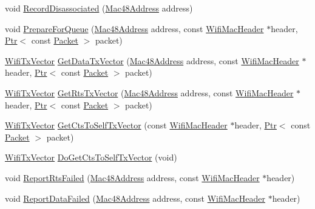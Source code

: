 \begin{DoxyCompactItemize}
void \hyperlink{classns3_1_1WifiRemoteStationManager_abcb92c63342aed2603c1dfb131e0fe8a}{Record\+Disassociated} (\hyperlink{classns3_1_1Mac48Address}{Mac48\+Address} address)
\item 
void \hyperlink{classns3_1_1WifiRemoteStationManager_a4812b9abae368de05cbd1393b7053f90}{Prepare\+For\+Queue} (\hyperlink{classns3_1_1Mac48Address}{Mac48\+Address} address, const \hyperlink{classns3_1_1WifiMacHeader}{Wifi\+Mac\+Header} $\ast$header, \hyperlink{classns3_1_1Ptr}{Ptr}$<$ const \hyperlink{classns3_1_1Packet}{Packet} $>$ packet)
\item 
\hyperlink{classns3_1_1WifiTxVector}{Wifi\+Tx\+Vector} \hyperlink{classns3_1_1WifiRemoteStationManager_ad81efbe48611977c8cea482721fd823b}{Get\+Data\+Tx\+Vector} (\hyperlink{classns3_1_1Mac48Address}{Mac48\+Address} address, const \hyperlink{classns3_1_1WifiMacHeader}{Wifi\+Mac\+Header} $\ast$header, \hyperlink{classns3_1_1Ptr}{Ptr}$<$ const \hyperlink{classns3_1_1Packet}{Packet} $>$ packet)
\item 
\hyperlink{classns3_1_1WifiTxVector}{Wifi\+Tx\+Vector} \hyperlink{classns3_1_1WifiRemoteStationManager_a0f4f6984f11037508c46a1af90508a34}{Get\+Rts\+Tx\+Vector} (\hyperlink{classns3_1_1Mac48Address}{Mac48\+Address} address, const \hyperlink{classns3_1_1WifiMacHeader}{Wifi\+Mac\+Header} $\ast$header, \hyperlink{classns3_1_1Ptr}{Ptr}$<$ const \hyperlink{classns3_1_1Packet}{Packet} $>$ packet)
\item 
\hyperlink{classns3_1_1WifiTxVector}{Wifi\+Tx\+Vector} \hyperlink{classns3_1_1WifiRemoteStationManager_a927bcc3d3c01646eed7a5e9d741c243b}{Get\+Cts\+To\+Self\+Tx\+Vector} (const \hyperlink{classns3_1_1WifiMacHeader}{Wifi\+Mac\+Header} $\ast$header, \hyperlink{classns3_1_1Ptr}{Ptr}$<$ const \hyperlink{classns3_1_1Packet}{Packet} $>$ packet)
\item 
\hyperlink{classns3_1_1WifiTxVector}{Wifi\+Tx\+Vector} \hyperlink{classns3_1_1WifiRemoteStationManager_aa8b7470c26610407756a92a5fcb4bf4b}{Do\+Get\+Cts\+To\+Self\+Tx\+Vector} (void)
\item 
void \hyperlink{classns3_1_1WifiRemoteStationManager_ad3844da681fd76f907293f5ff45187ec}{Report\+Rts\+Failed} (\hyperlink{classns3_1_1Mac48Address}{Mac48\+Address} address, const \hyperlink{classns3_1_1WifiMacHeader}{Wifi\+Mac\+Header} $\ast$header)
\item 
void \hyperlink{classns3_1_1WifiRemoteStationManager_a36ca84ae0bbcd9b95cc353a568023e8b}{Report\+Data\+Failed} (\hyperlink{classns3_1_1Mac48Address}{Mac48\+Address} address, const \hyperlink{classns3_1_1WifiMacHeader}{Wifi\+Mac\+Header} $\ast$header)

\end{DoxyCompactItemize}
